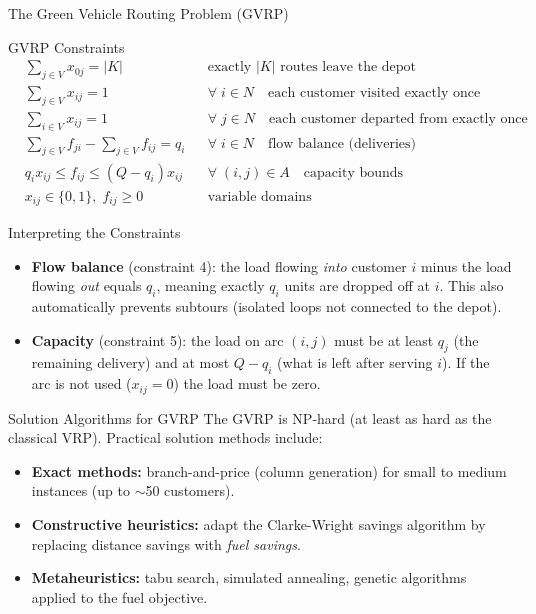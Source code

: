\documentclass[aspectratio=169,10pt]{beamer}
\begin{document}
\begin{frame}[allowframebreaks]{The Green Vehicle Routing Problem (GVRP)}
  \framebreak

  \begin{block}{GVRP Constraints}
    \begin{align}
      &\sum_{j \in V} x_{0j} = |K| && \text{exactly } |K| \text{ routes leave the depot} \\[4pt]
      &\sum_{j \in V} x_{ij} = 1 && \forall\; i \in N \quad \text{each customer visited exactly once} \\[4pt]
      &\sum_{i \in V} x_{ij} = 1 && \forall\; j \in N \quad \text{each customer departed from exactly once} \\[4pt]
      &\sum_{j \in V} f_{ji} - \sum_{j \in V} f_{ij} = q_i && \forall\; i \in N \quad \text{flow balance (deliveries)} \\[4pt]
      &q_i x_{ij} \leq f_{ij} \leq (Q - q_i) x_{ij} && \forall\; (i,j)\in A \quad \text{capacity bounds} \\[4pt]
      &x_{ij} \in \{0,1\},\; f_{ij} \geq 0 && \text{variable domains}
    \end{align}
  \end{block}

  \begin{block}{Interpreting the Constraints}
    \begin{itemize}
      \item \textbf{Flow balance} (constraint 4): the load flowing \emph{into}
      customer $i$ minus the load flowing \emph{out} equals $q_i$, meaning
      exactly $q_i$ units are dropped off at $i$.  This also automatically
      prevents subtours (isolated loops not connected to the depot).
      \item \textbf{Capacity} (constraint 5): the load on arc $(i,j)$ must be
      at least $q_j$ (the remaining delivery) and at most $Q - q_i$ (what is
      left after serving $i$).  If the arc is not used ($x_{ij}=0$) the load
      must be zero.
    \end{itemize}
  \end{block}

  \framebreak

  \begin{block}{Solution Algorithms for GVRP}
    The GVRP is NP-hard (at least as hard as the classical VRP).  Practical
    solution methods include:
    \begin{itemize}
      \item \textbf{Exact methods:} branch-and-price (column generation)
      for small to medium instances (up to $\sim$50 customers).
      \item \textbf{Constructive heuristics:} adapt the Clarke-Wright savings
      algorithm by replacing distance savings with \emph{fuel savings}.
      \item \textbf{Metaheuristics:} tabu search, simulated annealing, genetic
      algorithms applied to the fuel objective.
    \end{itemize}
  \end{block}


\end{frame}
\end{document}
